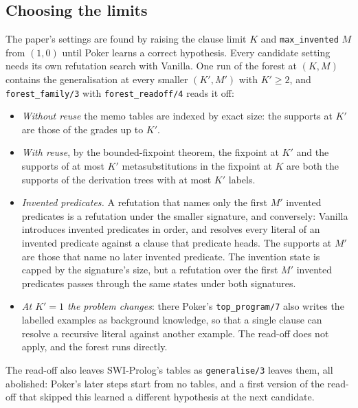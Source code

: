 \documentclass[11pt]{article}
\begin{document}
\subsection{Choosing the limits}\label{sec:readoff}

The paper's settings are found by raising the clause limit $K$ and
\texttt{max\_invented} $M$ from $(1, 0)$ until Poker learns a correct hypothesis.
Every candidate setting needs its own refutation search with Vanilla. One run of the
forest at $(K, M)$ contains the generalisation at every smaller $(K', M')$ with
$K' \ge 2$, and \nolinkurl{forest_family/3} with \nolinkurl{forest_readoff/4} reads it
off:
\begin{itemize}
\item \emph{Without reuse} the memo tables are indexed by exact size: the supports at
  $K'$ are those of the grades up to $K'$.
\item \emph{With reuse}, by the bounded-fixpoint theorem, the fixpoint at $K'$ and the
  supports of at most $K'$ metasubstitutions in the fixpoint at $K$ are both the
  supports of the derivation trees with at most $K'$ labels.
\item \emph{Invented predicates.} A refutation that names only the first $M'$ invented
  predicates is a refutation under the smaller signature, and conversely: Vanilla
  introduces invented predicates in order, and resolves every literal of an invented
  predicate against a clause that predicate heads. The supports at $M'$ are those
  that name no later invented predicate. The invention state is capped by the
  signature's size, but a refutation over the first $M'$ invented predicates passes
  through the same states under both signatures.
\item \emph{At $K' = 1$ the problem changes}: there Poker's \nolinkurl{top_program/7}
  also writes the labelled examples as background knowledge, so that a single clause
  can resolve a recursive literal against another example. The read-off does not
  apply, and the forest runs directly.
\end{itemize}
The read-off also leaves SWI-Prolog's tables as \nolinkurl{generalise/3} leaves them, all
abolished: Poker's later steps start from no tables, and a first version of the
read-off that skipped this learned a different hypothesis at the next candidate.
\end{document}

